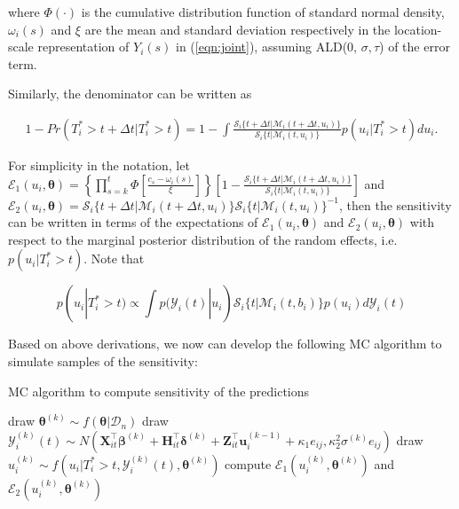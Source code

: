 where $\Phi(\cdot)$ is the cumulative distribution function of standard normal density, $\omega_i(s)$ and $\xi$ are the mean and standard deviation respectively in the location-scale representation of $Y_i(s)$ in (\ref{eqn:joint}), assuming ALD(0, $\sigma, \tau$) of the error term.\par

Similarly, the denominator can be written as

\begin{eqnarray}
1-Pr(T_i^* > t+\Delta t|T_i^*>t)=1-\int\frac{\mathcal{S}_i\{t+\Delta t|\mathcal{M}_i(t+\Delta t, u_i)\}}{\mathcal{S}_i\{t|\mathcal{M}_i(t,u_i)\}}p(u_i|T^*_i>t)du_i.
\end{eqnarray}

For simplicity in the notation, let $\mathcal{E}_1(u_i, \boldsymbol{\theta})=\left\{\prod_{s=k}^t\Phi\left[\frac{c_s-\omega_i(s)}{\xi}\right]\right\}\left[1-\frac{\mathcal{S}_i\{t+\Delta t|\mathcal{M}_i(t+\Delta t, u_i)\}}{\mathcal{S}_i\{t|\mathcal{M}_i(t,u_i)\}}\right]$ and $\mathcal{E}_2(u_i, \boldsymbol{\theta})=\mathcal{S}_i\{t+\Delta t|\mathcal{M}_i(t+\Delta t, u_i)\}\mathcal{S}_i\{t|\mathcal{M}_i(t,u_i)\}^{-1}$, then the sensitivity can be written in terms of the expectations of $\mathcal{E}_1(u_i, \boldsymbol{\theta})$ and $\mathcal{E}_2(u_i, \boldsymbol{\theta})$ with respect to the marginal posterior distribution of the random effects, i.e. $p(u_i|T^*_i>t)$. Note that 

\begin{equation}\label{eqn:maginal_post}
p(u_i|T^*_i>t)\propto\int p(\mathcal{Y}_i(t)|u_i)\mathcal{S}_i\{t|\mathcal{M}_i(t, b_i)\}p(u_i)d\mathcal{Y}_i(t)
\end{equation}

Based on above derivations, we now can develop the following MC algorithm to simulate samples of the sensitivity:

\begin{algorithm}[H]
\caption{MC algorithm to compute sensitivity of the predictions}\label{draw_sensitivity}
\begin{algorithmic}
\State draw $\boldsymbol{\theta}^{(k)}\sim f(\boldsymbol{\theta}|\mathcal{D}_n)$
\State draw $\mathcal{Y}^{(k)}_i(t)\sim N({\boldsymbol X}_{it}^{\top}\boldsymbol{\beta}^{(k)} + {\boldsymbol H}_{it}^{\top}\boldsymbol{\delta}^{(k)} + {\boldsymbol Z}_{it}^{\top}{\boldsymbol u}_i^{(k-1)} + \kappa_1 e_{ij}, \kappa_2^2\sigma^{(k)} e_{ij} )$
\State draw $u^{(k)}_i\sim f(u_i|T_i^*>t, \mathcal{Y}^{(k)}_i(t), \boldsymbol{\theta}^{(k)})$
\State compute $\mathcal{E}_1(u_i^{(k)}, \boldsymbol{\theta}^{(k)})$ and $\mathcal{E}_2(u_i^{(k)}, \boldsymbol{\theta}^{(k)})$
\EndFor
\end{algorithmic}
\end{algorithm}


